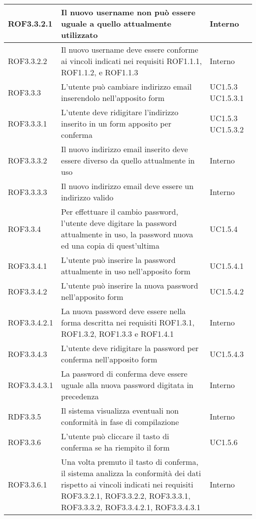 \begin{center}
\begin{longtable}{| p{2.5cm} | p{8cm} | p{2cm} |}
		\hline
		ROF3.3.2.1  &  Il nuovo username non può essere uguale a quello attualmente utilizzato  &  Interno \\
		\hline
		ROF3.3.2.2  &  Il nuovo username deve essere conforme ai vincoli indicati nei requisiti ROF1.1.1, ROF1.1.2,  e ROF1.1.3  &  Interno \\
		\hline
		ROF3.3.3  &  L'utente può cambiare indirizzo email inserendolo nell'apposito form  &  UC1.5.3 \newline UC1.5.3.1  \\
		\hline
		ROF3.3.3.1  &  L'utente deve ridigitare l'indirizzo inserito in un form apposito per conferma  &  UC1.5.3 \newline UC1.5.3.2  \\
		\hline
		ROF3.3.3.2  &  Il nuovo indirizzo email inserito deve essere diverso da quello attualmente in uso  &  Interno \\
		\hline
		ROF3.3.3.3  &  Il nuovo indirizzo email deve essere un indirizzo valido  &  Interno \\
		\hline
		ROF3.3.4  &  Per effettuare il cambio password, l'utente deve digitare la password attualmente in uso, la password nuova ed una copia di quest'ultima  &  UC1.5.4 \\
		\hline
		ROF3.3.4.1  &  L'utente può inserire la password attualmente in uso nell'apposito form  &  UC1.5.4.1 \\
		\hline
		ROF3.3.4.2  &  L'utente può inserire la nuova password nell'apposito form  &  UC1.5.4.2 \\
		\hline
		ROF3.3.4.2.1  &  La nuova password deve essere nella forma descritta nei requisiti ROF1.3.1, ROF1.3.2, ROF1.3.3 e ROF1.4.1  &  Interno \\
		\hline
		ROF3.3.4.3  &  L'utente deve ridigitare la password per conferma nell'apposito form  &  UC1.5.4.3 \\
		\hline
		ROF3.3.4.3.1  &  La password di conferma deve essere uguale alla nuova password digitata in precedenza  &  Interno \\
		\hline
		RDF3.3.5  &  Il sistema visualizza eventuali non conformità in fase di compilazione  &  Interno \\
		\hline
		ROF3.3.6  &  L'utente può cliccare il tasto di conferma se ha riempito il form  &  UC1.5.6 \\
		\hline
		ROF3.3.6.1  &  Una volta premuto il tasto di conferma, il sistema analizza la conformità dei dati rispetto ai vincoli indicati nei requisiti ROF3.3.2.1, ROF3.3.2.2, ROF3.3.3.1, ROF3.3.3.2, ROF3.3.4.2.1, ROF3.3.4.3.1  &  Interno \\

\end{longtable}
\end{center}
